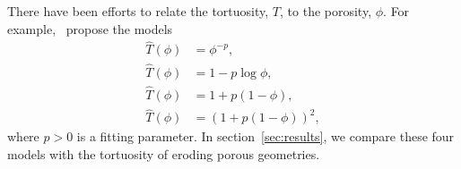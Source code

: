 \documentclass{jfm}
\begin{document}
There have been efforts to relate the tortuosity, $T$, to the porosity,
$\phi$.  For example,~\citet{mat-kha-koz2008} propose the
models
\begin{subequations}
  \label{eqn:tortuosityModels}
  \begin{align}
    \widehat{T}(\phi) &= \phi^{-p}, \\
    \widehat{T}(\phi) &= 1-p \log \phi, \\
    \widehat{T}(\phi) &= 1+p (1-\phi), \\
    \widehat{T}(\phi) &= (1+p (1-\phi))^2, 
  \end{align}
\end{subequations}
where $p>0$ is a fitting parameter.  In section~\ref{sec:results}, we
compare these four models with the tortuosity of eroding porous
geometries.

\end{document}
